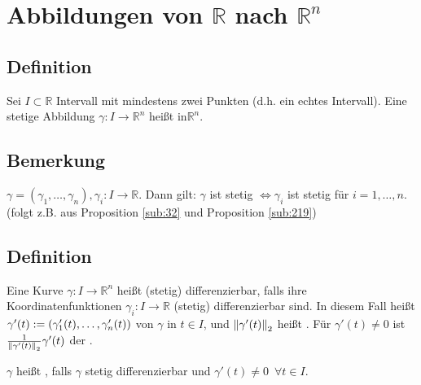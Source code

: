 \section{Abbildungen von $\mathds{R}$ nach $\mathds{R}^n$} %
\label{sec:5}

\subsection[Definition: Kurve]{Definition} %
\label{sub:51}
Sei $I \subset \mathds{R}$ Intervall mit mindestens zwei Punkten (d.h. ein echtes Intervall). Eine stetige Abbildung $\gamma : I \to \mathds{R}^n$ heißt  
in$\mathds{R}^n$. 

\subsection[Bemerkung: Stetigkeit von $\gamma : \mathds{R} \to \mathds{R}^n$]{Bemerkung} %
\label{sub:52}
$\gamma = (\gamma_1,\ldots ,\gamma_n), \gamma_i : I \to \mathds{R}$. Dann gilt: $\gamma$ ist stetig $\iff \gamma_i$ ist stetig für $i=1,\ldots ,n$.
(folgt z.B. aus Proposition \ref{sub:32} und Proposition \ref{sub:219})

\subsection[Definition: Tangentialvektor, Geschwindigkeit und regulär]{Definition} %
\label{sub:53}
Eine Kurve $\gamma : I  \to \mathds{R}^n$ heißt (stetig) differenzierbar, falls ihre Koordinatenfunktionen $\gamma_i : I  \to \mathds{R}$ (stetig) differenzierbar sind.
In diesem Fall heißt $\gamma'(t) := \enbrace*{\gamma'_1 (t), \ldots , \gamma'_n(t)} $  von $\gamma$ in $t \in I$, und $\norm[2]{\gamma'(t)} $ heißt
. Für $\gamma'(t) \not= 0$ ist $\frac{1}{\norm[2]{\gamma'(t)} } \gamma'(t) $ der .

$\gamma$ heißt , falls $\gamma$ stetig differenzierbar und $\gamma'(t) \not=0 \enspace\forall t \in I$.    

